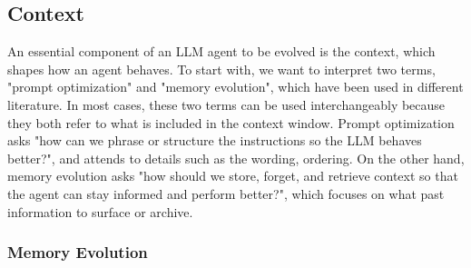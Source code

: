 \subsection{Context}

An essential component of an LLM agent to be evolved is the context, which shapes how an agent behaves. To start with, we want to interpret two terms, "prompt optimization" and "memory evolution", which have been used in different literature. In most cases, these two terms can be used interchangeably because they both refer to what is included in the context window. Prompt optimization asks "how can we phrase or structure the instructions so the LLM behaves better?", and attends to details such as the wording, ordering. On the other hand, memory evolution asks "how should we store, forget, and retrieve context so that the agent can stay informed and perform better?", which focuses on what past information to surface or archive.

\subsubsection{Memory Evolution} 

